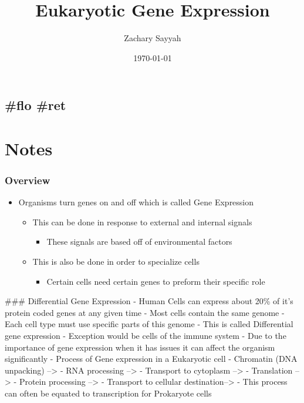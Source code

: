 \documentclass[letterpaper]{article}
\author{Zachary Sayyah}
\date{\today}
\title{Eukaryotic Gene Expression}
\renewcommand\maketitle{}
\begin{document}
\maketitle


\subsection{\#flo \#ret}
\label{sec:org440d8b2}
\section{Notes}
\label{sec:orgd146db7}
\subsubsection{Overview}
\label{sec:org974634b}
\begin{itemize}
\item Organisms turn genes on and off which is called Gene Expression

\begin{itemize}
\item This can be done in response to external and internal signals

\begin{itemize}
\item These signals are based off of environmental factors
\end{itemize}

\item This is also be done in order to specialize cells

\begin{itemize}
\item Certain cells need certain genes to preform their specific role
\end{itemize}
\end{itemize}
\end{itemize}

\#\#\# Differential Gene Expression - Human Cells can express about 20\% of
it's protein coded genes at any given time - Most cells contain the same
genome - Each cell type must use specific parts of this genome - This is
called Differential gene expression - Exception would be cells of the
immune system - Due to the importance of gene expression when it has
issues it can affect the organism significantly - Process of Gene
expression in a Eukaryotic cell - Chromatin (DNA unpacking) --> - RNA
processing --> - Transport to cytoplasm --> - Translation --> - Protein
processing --> - Transport to cellular destination--> - This process can
often be equated to transcription for Prokaryote cells
\end{document}
